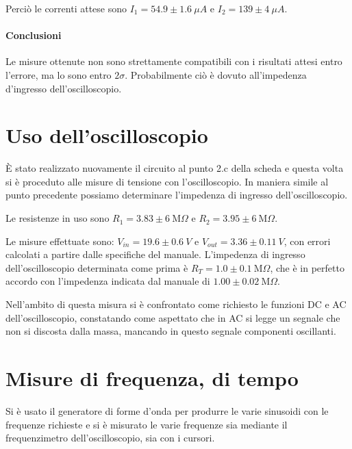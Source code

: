 \documentclass[10pt,a4paper]{article}
\newcommand\ohm{\Omega}
\begin{document}
Perciò le correnti attese sono $I_1 = 54.9 \pm 1.6 ~\mu A$ e $I_2 = 139 \pm 4~ \mu A$.

\paragraph{Conclusioni} Le misure ottenute non sono strettamente compatibili con i risultati attesi entro l'errore, ma lo sono entro $2 \sigma$. Probabilmente ciò è dovuto all'impedenza d'ingresso dell'oscilloscopio. 

\section{Uso dell'oscilloscopio}
È stato realizzato nuovamente il circuito al punto 2.c della scheda e questa volta si è proceduto alle misure di tensione con l'oscilloscopio. In maniera simile al punto precedente possiamo determinare l'impedenza di ingresso dell'oscilloscopio.

Le resistenze in uso sono $R_1 = 3.83 \pm 6~\text{M}\ohm$ e  $R_2 = 3.95 \pm 6~\text{M}\ohm$.

Le misure effettuate sono: $V_{in}=19.6 \pm 0.6 ~V$ e $V_{out}= 3.36 \pm 0.11 ~ V$, con errori calcolati a partire dalle specifiche del manuale. L'impedenza di ingresso dell'oscilloscopio determinata come prima è $R_T=1.0 \pm 0.1 ~ \text{M}\ohm$, che è in perfetto accordo con l'impedenza indicata dal manuale di $1.00 \pm 0.02 ~\text{M} \ohm$.

Nell'ambito di questa misura si è confrontato come richiesto le funzioni DC e AC dell'oscilloscopio, constatando come aspettato che in AC si legge un segnale che non si discosta dalla massa, mancando in questo segnale componenti oscillanti.

\section{Misure di frequenza, di tempo}

Si è usato il generatore di forme d'onda per produrre le varie sinusoidi con le frequenze richieste e si è misurato le varie frequenze sia mediante il frequenzimetro dell'oscilloscopio, sia con i cursori.
\end{document}
